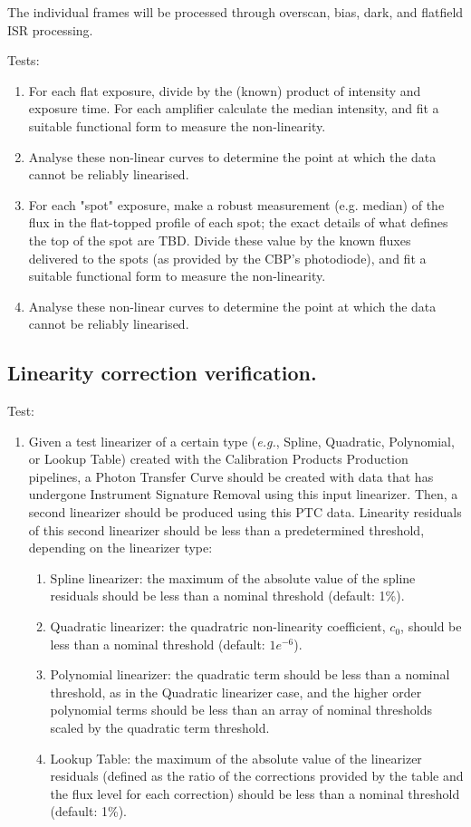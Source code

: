 \documentclass[DM,authoryear,toc,lsstdraft]{lsstdoc}
\begin{document}
The individual frames will be processed through overscan, bias, dark, and flatfield ISR processing.

Tests:
\begin{enumerate}
\item For each flat exposure, divide by the (known) product of intensity and exposure time.
For each amplifier calculate the median intensity, and fit a suitable functional form
to measure the non-linearity.
\item Analyse these non-linear curves to determine the point at which the data cannot be reliably
linearised.
\item For each "spot" exposure, make a robust measurement (e.g. median) of the flux in the flat-topped profile of
each spot; the exact details of what defines the top of the spot are TBD.  Divide these value by the known
fluxes delivered to the spots (as provided by the CBP's photodiode), and fit a suitable functional form to
measure the non-linearity.
\item Analyse these non-linear curves to determine the point at which the data cannot be reliably
linearised.
\end{enumerate}


\subsection{Linearity correction verification.}

Test:
\begin{enumerate}
	\item Given a test linearizer of a certain type (\emph{e.g.}, Spline, Quadratic, Polynomial, or Lookup Table) created with the Calibration Products Production pipelines, a Photon Transfer Curve should be created with data that has undergone Instrument Signature Removal using this input linearizer. Then, a second linearizer should be produced using this PTC data. Linearity residuals of this second linearizer should be less than a predetermined threshold, depending on the linearizer type:
		\begin{enumerate}
			\item Spline linearizer: the maximum of the absolute value of the spline residuals should be less than a nominal threshold (default: 1\%).
			\item Quadratic linearizer: the quadratric non-linearity coefficient, $c_0$, should be less than a nominal threshold (default: $1e^{-6}$).
			\item Polynomial linearizer: the quadratic term should be less than a nominal threshold, as in the Quadratic linearizer case, and the higher order polynomial terms should be less than an array of nominal thresholds scaled by the quadratic term threshold.
			\item Lookup Table: the maximum of the absolute value of the linearizer residuals (defined as the ratio of the corrections provided by the table and the flux level for each correction) should be less than a nominal threshold (default: 1\%).
		\end{enumerate}
 
\end{enumerate}
\end{document}
